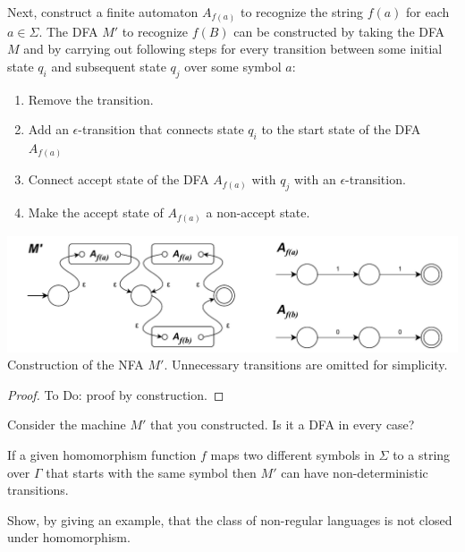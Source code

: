 \documentclass[11pt]{article}
\newenvironment{problem}[2][Problem]{\begin{trivlist}
\item[\hskip \labelsep {\bfseries #1}\hskip \labelsep {\bfseries #2.}]}{\end{trivlist}}
\begin{document}
Next, construct a finite automaton $A_{f(a)}$ to recognize the string $f(a)$ for each $a \in \Sigma$. The DFA $M'$ to recognize $f(B)$ can be constructed by taking the DFA $M$ and by carrying out following steps for every transition between some initial state $q_{i}$ and subsequent state $q_{j}$ over some symbol $a$:
\begin{enumerate}
\item Remove the transition.
\item Add an $\epsilon$-transition that connects state $q_{i}$ to the start state of the DFA $A_{f(a)}$
\item Connect accept state of the DFA $A_{f(a)}$ with $q_{j}$ with an $\epsilon$-transition.
\item Make the accept state of $A_{f(a)}$ a non-accept state.
\end{enumerate}

\begin{center}
\includegraphics[scale=0.8]{Figures/Problem1.66b.pdf} \\
Construction of the NFA $M'$. Unnecessary transitions are omitted for simplicity.
\end{center}

\begin{proof}
To Do: proof by construction.
\end{proof}

Consider the machine $M'$ that you constructed. Is it a DFA in every case?

If a given homomorphism function $f$ maps two different symbols in $\Sigma$ to a string over $\Gamma$ that starts with the same symbol then $M'$ can have non-deterministic transitions.

\begin{problem}[Part]{b}
Show, by giving an example, that the class of non-regular languages is not
closed under homomorphism.
\end{problem}
\end{document}
